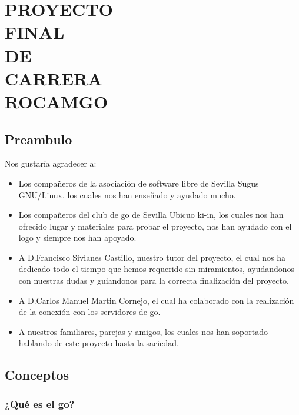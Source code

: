 \documentclass[12pt,a4paper]{report}
\author{David Medina Velasco \and Víctor Ramírez de la Corte}
\begin{document}
\part*{PROYECTO\\ FINAL\\ DE \\CARRERA \\ ROCAMGO\\}

\marginsize{3cm}{2cm}{2cm}{2cm} %

\tableofcontents  %
 

 
\chapter*{Preambulo} 

Nos gustaría agradecer a:
\begin{itemize}
\item Los compañeros de la asociación de software libre de Sevilla Sugus GNU/Linux, los cuales nos han enseñado y ayudado mucho.
\item Los compañeros del club de go de Sevilla Ubicuo ki-in, los cuales nos han ofrecido lugar y materiales para probar el proyecto, nos han ayudado con el logo y siempre nos han apoyado. 
\item A D.Francisco Sivianes Castillo, nuestro tutor del proyecto, el cual nos ha dedicado todo el tiempo que hemos requerido sin miramientos, ayudandonos con nuestras dudas y guiandonos para la correcta finalización del proyecto.
\item A D.Carlos Manuel Martin Cornejo, el cual ha colaborado con la realización de la conexión con los servidores de go.
\item A nuestros familiares, parejas y amigos, los cuales nos han soportado hablando de este proyecto hasta la saciedad.
 
\end{itemize}


\chapter{Conceptos}
\section{¿Qué es el go?}
\end{document}
